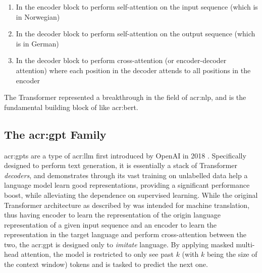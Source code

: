 \begin{enumerate}
    \item In the encoder block to perform self-attention on the input sequence (which is in Norwegian)
    \item In the decoder block to perform self-attention on the output sequence (which is in German)
    \item In the decoder block to perform cross-attention (or encoder-decoder attention) where each position in the decoder attends to all positions in the encoder
\end{enumerate}

The Transformer represented a breakthrough in the field of \gls{acr:nlp}, and is the fundamental building block of  like \acrshort{acr:bert}.


\subsection[The GPT Family]{The \acrshort{acr:gpt} Family}\label{subsec:gpt}

\glspl{acr:gpt} are a type of \gls{acr:llm} first introduced by OpenAI in 2018 \citep{radfordImprovingLanguageUnderstanding2018}. Specifically designed to perform text generation, it is essentially a stack of Transformer \textit{decoders}, and demonstrates through its vast training on unlabelled data help a language model learn good representations, providing a significant performance boost, while alleviating the dependence on supervised learning. While the original Transformer architecture as described by \cite{vaswaniAttentionAllYou2017} was intended for machine translation, thus having encoder to learn the representation of the origin language representation of a given input sequence and an encoder to learn the representation in the target language and perform cross-attention between the two, the \acrshort{acr:gpt} is designed only to \textit{imitate} language. By applying masked multi-head attention, the model is restricted to only see past $k$ (with $k$ being the size of the context window) tokens and is tasked to predict the next one.

